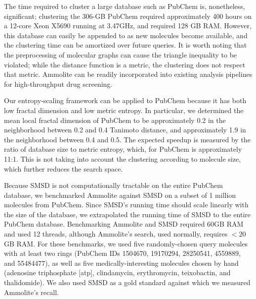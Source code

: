 \documentclass[11pt]{elsarticle}
\theoremstyle{definition}
\theoremstyle{remark}
\numberwithin{equation}{section}
\begin{document}
The time required to cluster a large database such as PubChem is, nonetheless, significant; clustering the 306-GB PubChem required approximately 400 hours on a
12-core Xeon X5690 running at 3.47GHz, and required 128 GB RAM.
However, this database can easily be appended to as new molecules become available, and the clustering time can be amortized over future queries.
It is worth noting that the preprocessing of molecular graphs can cause the 
triangle inequality to be violated; while the distance function is a metric, the
clustering does not respect that metric.
Ammolite can be readily incorporated into existing analysis pipelines for 
high-throughput drug screening.

Our entropy-scaling framework can be applied to PubChem because it has both low fractal
dimension and low metric entropy.
In particular, we determined the mean local fractal dimension of PubChem to be 
approximately 0.2 in the neighborhood between 0.2 and 0.4 Tanimoto distance,
and approximately 1.9 in the neighborhood between 0.4 and 0.5.
The expected speedup is measured by the ratio of database size to metric entropy, which, for PubChem is approximately 11:1.
This is not taking into account the clustering according to molecule size, which
further reduces the search space.

Because SMSD is not computationally tractable on the entire PubChem database,
we benchmarked Ammolite against SMSD on a subset of 1 million molecules from PubChem.
Since SMSD's running time should scale linearly with the size of the database, we extrapolated the
running time of SMSD to the entire PubChem database.
Benchmarking Ammolite and SMSD required 60GB RAM and used 12 threads, although
Ammolite's search, used normally, requires $< 20$ GB RAM.
For these benchmarks, we used five randomly-chosen query molecules with at least two rings (PubChem IDs 1504670, 19170294, 28250541, 4559889, and 55484477), as well as five medically-interesting molecules chosen by hand (adenosine triphosphate [atp], clindamycin, erythromycin, teixobactin, and thalidomide).
We also used SMSD as a gold standard against which we measured Ammolite's recall.
\end{document}
